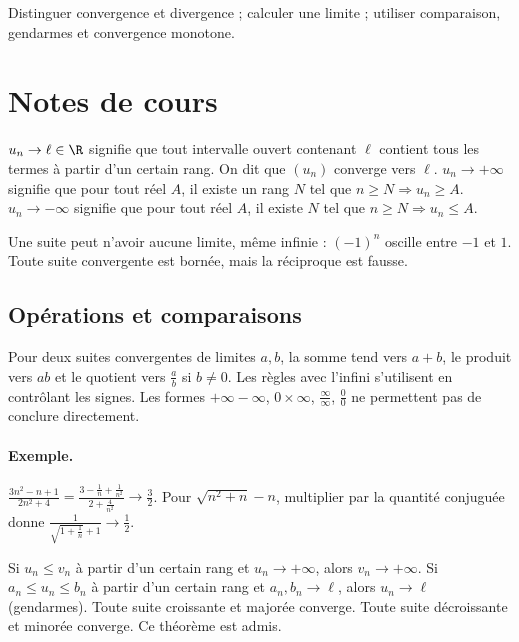 \label{ch:2}


\begin{keypoint}[Objectifs]Distinguer convergence et divergence ; calculer une limite ; utiliser comparaison, gendarmes et convergence monotone.\end{keypoint}

\section{Notes de cours}
\begin{keypoint}[Définitions]
$u_n\to\ell\in\R$ signifie que tout intervalle ouvert contenant $\ell$ contient tous les termes à partir d'un certain rang. On dit que $(u_n)$ converge vers $\ell$.
$u_n\to+\infty$ signifie que pour tout réel $A$, il existe un rang $N$ tel que $n\ge N\Rightarrow u_n\ge A$. $u_n\to-\infty$ signifie que pour tout réel $A$, il existe $N$ tel que $n\ge N\Rightarrow u_n\le A$.
\end{keypoint}
Une suite peut n'avoir aucune limite, même infinie : $(-1)^n$ oscille entre $-1$ et $1$. Toute suite convergente est bornée, mais la réciproque est fausse.
\subsection{Opérations et comparaisons}
Pour deux suites convergentes de limites $a,b$, la somme tend vers $a+b$, le produit vers $ab$ et le quotient vers $\frac{a}{b}$ si $b\ne0$. Les règles avec l'infini s'utilisent en contrôlant les signes. Les formes $+\infty-\infty$, $0\times\infty$, $\frac{\infty}{\infty}$, $\frac{0}{0}$ ne permettent pas de conclure directement.
\paragraph{Exemple.} $\frac{3n^2-n+1}{2n^2+4}=\frac{3-\frac{1}{n}+\frac{1}{n^2}}{2+\frac{4}{n^2}}\to\frac{3}{2}$. Pour $\sqrt{n^2+n}-n$, multiplier par la quantité conjuguée donne $\frac{1}{\sqrt{1+\frac{1}{n}}+1}\to\frac{1}{2}$.
\begin{keypoint}[Théorèmes]
Si $u_n\le v_n$ à partir d'un certain rang et $u_n\to+\infty$, alors $v_n\to+\infty$. Si $a_n\le u_n\le b_n$ à partir d'un certain rang et $a_n,b_n\to\ell$, alors $u_n\to\ell$ (gendarmes).
Toute suite croissante et majorée converge. Toute suite décroissante et minorée converge. Ce théorème est admis.
\end{keypoint}
